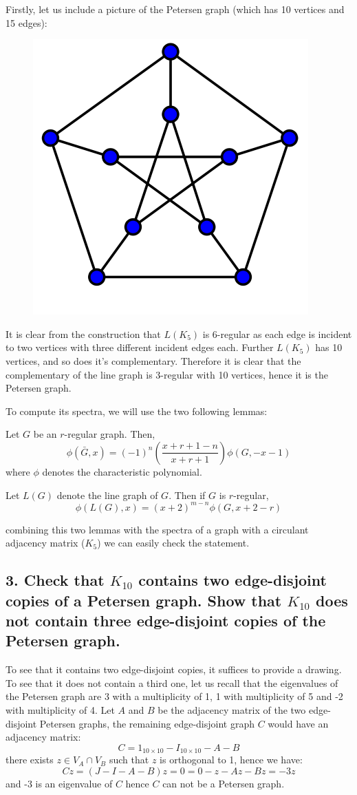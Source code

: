 Firstly, let us include a picture of the Petersen graph (which has 10 vertices and 15 edges):
\begin{figure}[h!]
    \centering
    \includegraphics[width=.2\textwidth]{img/spectra_2.png}
\end{figure}

It is clear from the construction that $L(K_5)$ is 6-regular as each edge is incident to two vertices with three different incident edges each.
Further $L(K_5)$ has 10 vertices, and so does it's complementary.
Therefore it is clear that the complementary of the line graph is 3-regular with 10 vertices, hence it is the Petersen graph.

To compute its spectra, we will use the two following lemmas:
\begin{lemma}
    Let $G$ be an $r$-regular graph. Then,
    $$\phi(\bar{G}, x) = (-1)^n\left( \frac{x + r + 1 - n}{x + r + 1} \right) \phi(G, -x -1)$$
    where $\phi$ denotes the characteristic polynomial. 
\end{lemma}
\begin{lemma}
    Let $L(G)$ denote the line graph of $G$. Then if $G$ is $r$-regular,
    $$\phi(L(G), x) = (x + 2)^{m - n} \phi(G, x + 2 -r)$$
\end{lemma}
combining this two lemmas with the spectra of a graph with a circulant adjacency matrix ($K_5$) we can easily check the statement.

\subsection[Spectra - 3]{3. Check that $K_{10}$ contains two edge-disjoint copies of a Petersen graph. Show that $K_10$ does not contain three edge-disjoint copies of the Petersen graph.}

To see that it contains two edge-disjoint copies, it suffices to provide a drawing.
To see that it does not contain a third one, let us recall that the eigenvalues of the Petersen graph are $3$ with a multiplicity of 1, 1 with multiplicity of 5 and -2 with multiplicity of 4.
Let $A$ and $B$ be the adjacency matrix of the two edge-disjoint Petersen graphs, the remaining edge-disjoint graph $C$ would have an adjacency matrix:
$$C = 1_{10 \times 10} - I_{10 \times 10} - A - B$$
there exists $z \in V_A \cap V_B$ such that $z$ is orthogonal to 1, hence we have:
$$C z = (J - I - A - B)z = 0 = 0 - z - Az - Bz = -3z$$
and -3 is an eigenvalue of $C$ hence $C$ can not be a Petersen graph.

